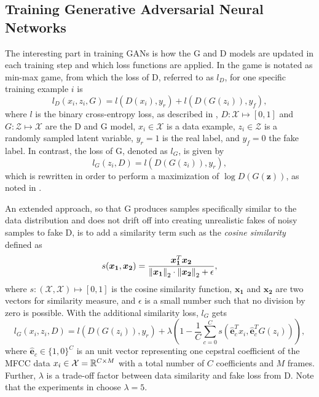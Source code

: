 \subsection{Training Generative Adversarial Neural Networks}\label{sec:nn_adv_train}
The interesting part in training GANs is how the G and D models are updated in each training step and which loss functions are applied.
In  the game is notated as min-max game, from which the loss of D, referred to as $l_D$, for one specific training example $i$ is
\begin{equation}
  l_D(x_i, z_i, G) = l(D(x_i), y_r) + l(D(G(z_i)), y_f),
\end{equation}
where $l$ is the binary cross-entropy loss, as described in , $D: \mathcal{X} \mapsto [0, 1]$ and $G: \mathcal{Z} \mapsto \mathcal{X}$ are the D and G model, $x_i \in \mathcal{X}$ is a data example, $z_i \in \mathcal{Z}$ is a randomly sampled latent variable, $y_r = 1$ is the real label, and $y_f = 0$ the fake label.
In contrast, the loss of G, denoted as $l_G$, is given by
\begin{equation}
  l_G(z_i, D) =  l(D(G(z_i)), y_r),
\end{equation}
which is rewritten in order to perform a maximization of $\log D(G(\bm{z}))$, as noted in .

An extended approach, so that G produces samples specifically similar to the data distribution and does not drift off into creating unrealistic fakes of noisy samples to fake D, is to add a similarity term such as the \emph{cosine similarity} defined as
\begin{equation}
  s(\bm{x_1}, \bm{x_2}) = \frac{\bm{x_1}^T \bm{x_2}}{\norm{\bm{x_1}}_2 \cdot \norm{\bm{x_2}}_2 + \epsilon},
\end{equation}
where $s : (\mathcal{X}, \mathcal{X}) \mapsto [0, 1]$ is the cosine similarity function, $\bm{x_1}$ and $\bm{x_2}$ are two vectors for similarity measure, and $\epsilon$ is a small number such that no division by zero is possible.
With the additional similarity loss, $l_G$ gets
\begin{equation}
  l_G(x_i, z_i, D) =  l(D(G(z_i)), y_r) + \lambda \left(1 - \frac{1}{C} \sum_{c=0}^{C} s(\hat{\bm{e}}_c^T x_i , \hat{\bm{e}}_c^T G(z_i)) \right),
\end{equation}
where $\hat{\bm{e}}_c \in \{1, 0\}^C$ is an unit vector representing one cepstral coefficient of the MFCC data $x_i \in \mathcal{X} = \mathbb{R}^{C \times M}$ with a total number of $C$ coefficients and $M$ frames.
Further, $\lambda$ is a trade-off factor between data similarity and fake loss from D.
Note that the experiments in  choose $\lambda = 5$.

